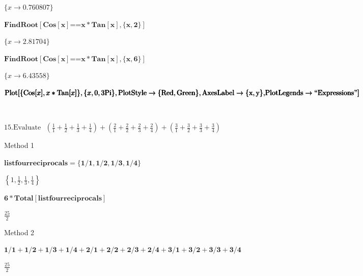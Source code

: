 \documentclass{article}
\begin{document}
\begin{doublespace}
\noindent\(\{x\to 0.760807\}\)
\end{doublespace}

\begin{doublespace}
\noindent\(\pmb{\text{FindRoot}[\text{Cos}[x]\text{==}x*\text{Tan}[x],\{x,2\}]}\)
\end{doublespace}

\begin{doublespace}
\noindent\(\{x\to 2.81704\}\)
\end{doublespace}

\begin{doublespace}
\noindent\(\pmb{\text{FindRoot}[\text{Cos}[x]\text{==}x*\text{Tan}[x],\{x,6\}]}\)
\end{doublespace}

\begin{doublespace}
\noindent\(\{x\to 6.43558\}\)
\end{doublespace}

\begin{doublespace}
\noindent\(\pmb{\text{Plot}[\{\text{Cos}[x],x*\text{Tan}[x]\},\{x,0,3\text{Pi}\},\text{PlotStyle}\to \{\text{Red},\text{Green}\},\text{AxesLabel}\to
\{\text{x},\text{y}\},}\\
\pmb{\text{PlotLegends}\to \text{{``}Expressions{''}}]}\)
\end{doublespace}

\begin{doublespace}
\noindent\(\begin{array}{cc}
  &  \\
\end{array}\)
\end{doublespace}

\(15. \text{Evaluate}\text{   }\left(\frac{1}{1}+\frac{1}{2}+\frac{1}{3}+\frac{1}{4}\right)+\left(\frac{2}{1}+\frac{2}{2}+\frac{2}{3}+\frac{2}{4}\right)+\left(\frac{3}{1}+\frac{3}{2}+\frac{3}{3}+\frac{3}{4}\right)\)

Method 1

\begin{doublespace}
\noindent\(\pmb{\text{listfourreciprocals}=\{1/1,1/2,1/3,1/4\}}\)
\end{doublespace}

\begin{doublespace}
\noindent\(\left\{1,\frac{1}{2},\frac{1}{3},\frac{1}{4}\right\}\)
\end{doublespace}

\begin{doublespace}
\noindent\(\pmb{6*\text{Total}[\text{listfourreciprocals}]}\)
\end{doublespace}

\begin{doublespace}
\noindent\(\frac{25}{2}\)
\end{doublespace}

Method 2

\begin{doublespace}
\noindent\(\pmb{1/1+1/2+1/3+1/4+2/1+2/2+2/3+2/4+3/1+3/2+3/3+3/4}\)
\end{doublespace}

\begin{doublespace}
\noindent\(\frac{25}{2}\)
\end{doublespace}
\end{document}
